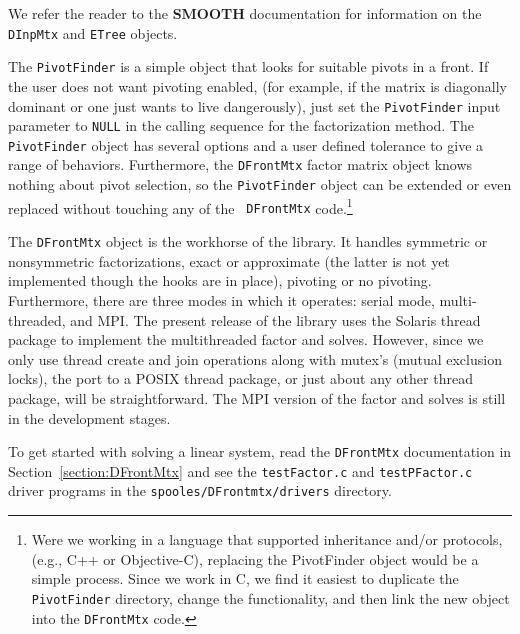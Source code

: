 We refer the reader to the {\bf SMOOTH} documentation for
information on the {\tt DInpMtx} and {\tt ETree} objects.
\par
The {\tt PivotFinder} is a simple object that looks for suitable
pivots in a front.
If the user does not want pivoting enabled, (for example, if the
matrix is diagonally dominant or one just wants to live
dangerously), just set the {\tt PivotFinder} input parameter to
{\tt NULL} in the calling sequence for the factorization method.
The {\tt PivotFinder} object has several options and a user defined 
tolerance to give a range of behaviors.
Furthermore, the {\tt DFrontMtx} factor matrix object knows nothing
about pivot selection, so the {\tt PivotFinder} object can be
extended or even replaced without touching any of the {\tt
DFrontMtx} code.\footnote{
Were we working in a language that supported inheritance and/or
protocols, (e.g., C++ or Objective-C), replacing the PivotFinder
object would be a simple process.
Since we work in C, we find it easiest to duplicate the 
{\tt PivotFinder} directory, change the functionality,
and then link the new object into the {\tt DFrontMtx} code.
}
\par
The {\tt DFrontMtx} object is the workhorse of the library.
It handles symmetric or nonsymmetric factorizations,
exact or approximate (the latter is not yet implemented though
the hooks are in place), pivoting or no pivoting.
Furthermore, there are three modes in which it operates:
serial mode, multi-threaded, and MPI.
The present release of the library uses the Solaris thread package 
to implement the multithreaded factor and solves.
However, since we only use thread create and join operations
along with mutex's (mutual exclusion locks), the port to a POSIX
thread package, or just about any other thread package, will
be straightforward.
The MPI version of the factor and solves is still in the
development stages.
\par
To get started with solving a linear system, 
read the {\tt DFrontMtx} documentation in
Section~\ref{section:DFrontMtx} and
see the {\tt testFactor.c}
and {\tt testPFactor.c} driver programs in the
{\tt spooles/DFrontmtx/drivers} directory.
